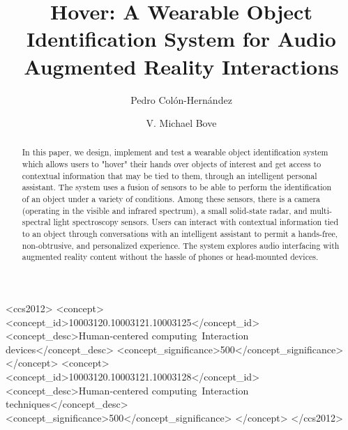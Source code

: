 \documentclass[sigchi, review]{acmart}
\begin{document}
\title{Hover: A Wearable Object Identification System for Audio Augmented Reality Interactions}

\author{Pedro Col\'on-Hern\'andez}

\author{V. Michael Bove}



\begin{abstract}
In this paper, we design, implement and test a wearable object identification system which allows users to "hover" their hands over objects of interest and get access to contextual information that may be tied to them, through an intelligent personal assistant. The system uses a fusion of sensors to be able to perform the identification of an object under a variety of conditions. Among these sensors, there is a camera (operating in the visible and infrared spectrum), a small solid-state radar, and multi-spectral light spectroscopy sensors. Users can interact with contextual information tied to an object through conversations with an intelligent assistant to permit a hands-free, non-obtrusive, and personalized experience. The system explores audio interfacing with augmented reality content without the hassle of phones or head-mounted devices.  
\end{abstract}

%
%
\begin{CCSXML}
<ccs2012>
<concept>
<concept_id>10003120.10003121.10003125</concept_id>
<concept_desc>Human-centered computing~Interaction devices</concept_desc>
<concept_significance>500</concept_significance>
</concept>
<concept>
<concept_id>10003120.10003121.10003128</concept_id>
<concept_desc>Human-centered computing~Interaction techniques</concept_desc>
<concept_significance>500</concept_significance>
</concept>
</ccs2012>
\end{CCSXML}
\end{document}
